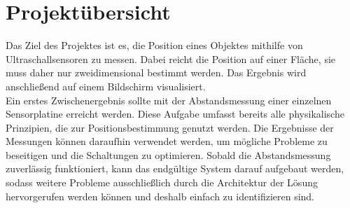 


\chapter{Projektübersicht}

Das Ziel des Projektes ist es, die Position eines Objektes mithilfe von Ultraschallsensoren zu messen. Dabei reicht die Position auf einer Fläche, sie muss daher nur zweidimensional bestimmt werden. Das Ergebnis wird anschließend auf einem Bildschirm visualisiert.\\
Ein erstes Zwischenergebnis sollte mit der Abstandsmessung einer einzelnen Sensorplatine erreicht werden. Diese Aufgabe umfasst bereits alle physikalische Prinzipien, die zur Positionsbestimmung genutzt werden. Die Ergebnisse der Messungen können daraufhin verwendet werden, um mögliche Probleme zu beseitigen und die Schaltungen zu optimieren. Sobald die Abstandsmessung zuverlässig funktioniert, kann das endgültige System darauf aufgebaut werden, sodass weitere Probleme ausschließlich durch die Architektur der Lösung hervorgerufen werden können und deshalb einfach zu identifizieren sind.


